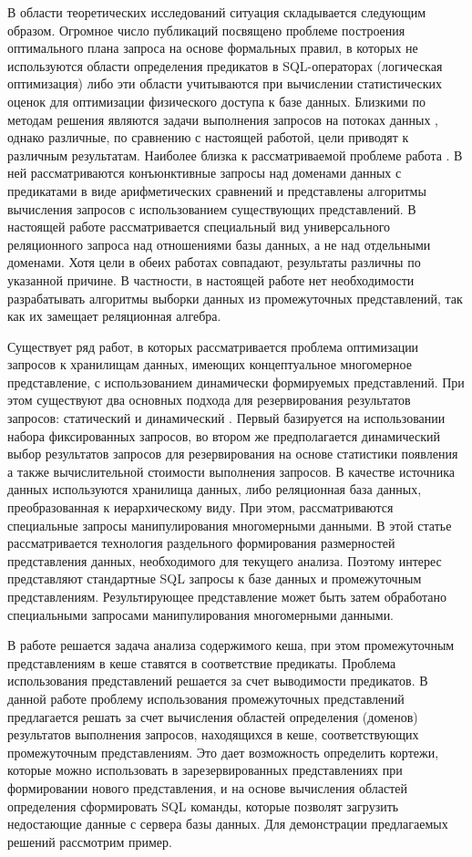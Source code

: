 \documentclass[10pt,a4paper]{article}
\begin{document}
В области теоретических исследований ситуация складывается следующим образом.
Огромное число публикаций посвящено проблеме построения оптимального плана
запроса на основе формальных правил, в которых не используются области
определения предикатов в SQL-операторах (логическая оптимизация) либо эти
области учитываются при вычислении статистических оценок для оптимизации
физического доступа к базе данных. Близкими по методам решения являются задачи выполнения
запросов на потоках данных \cite{Olston03, Denny05}, однако различные, по сравнению
с настоящей работой, цели приводят к различным результатам. Наиболее близка к
рассматриваемой проблеме работа \cite{Afrati06}. В ней рассматриваются конъюнктивные
запросы над доменами данных с предикатами в виде арифметических сравнений и
представлены алгоритмы вычисления запросов с использованием существующих
представлений. В настоящей работе рассматривается специальный вид универсального
реляционного запроса над отношениями базы данных, а не над отдельными доменами.
Хотя цели в обеих работах совпадают, результаты различны по указанной причине.
В частности, в настоящей работе нет необходимости разрабатывать алгоритмы выборки
данных из промежуточных представлений, так как их замещает реляционная алгебра.

Существует ряд работ, в которых рассматривается проблема оптимизации
запросов к хранилищам данных, имеющих концептуальное многомерное представление,
с использованием динамически формируемых представлений. При этом
существуют два основных подхода для резервирования результатов запросов:
статический \cite{baralis, gupta, gupta-mumick} и динамический \cite{scheuermann, shim,
kalnis, chang}. Первый базируется на использовании набора фиксированных запросов,
во втором же предполагается динамический выбор результатов запросов для резервирования на
основе статистики появления а также вычислительной стоимости выполнения
запросов. В качестве источника данных используются хранилища данных, либо
реляционная база данных, преобразованная к иерархическому виду. При этом,
рассматриваются специальные запросы манипулирования многомерными данными. 
В этой статье рассматривается технология раздельного формирования размерностей
представления данных, необходимого для текущего анализа. Поэтому интерес
представляют стандартные SQL запросы к базе данных и промежуточным представлениям. 
Результирующее представление может быть затем обработано специальными запросами
манипулирования многомерными данными.

В работе \cite{Keller96} решается задача анализа содержимого кеша,
при этом промежуточным представлениям
в кеше ставятся в соответствие предикаты. Проблема использования представлений
решается за счет выводимости предикатов. В данной работе проблему использования
промежуточных представлений предлагается решать за счет вычисления областей
определения (доменов) результатов выполнения запросов, находящихся в кеше,
соответствующих промежуточным представлениям. Это дает возможность
определить кортежи, которые можно использовать в зарезервированных представлениях
при формировании нового представления, и на основе вычисления областей определения
сформировать SQL команды, которые позволят загрузить недостающие данные с сервера
базы данных. Для демонстрации предлагаемых решений рассмотрим пример.
\end{document}
